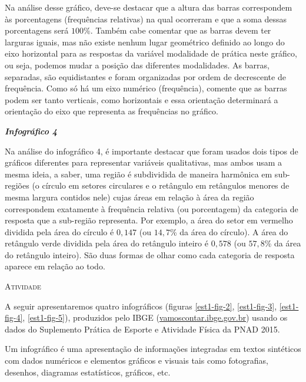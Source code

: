 \documentclass[10 pt,usenames,dvipsnames, oneside]{article}
\begin{document}
\begin{goals}
Na análise desse gráfico, deve-se destacar que a altura das barras correspondem às porcentagens (frequências relativas) na qual ocorreram e que a soma dessas porcentagens será $100$\%. Também cabe comentar que as barras devem ter larguras iguais, mas não existe nenhum lugar geométrico definido ao longo do eixo horizontal para as respostas da variável modalidade de prática neste gráfico, ou seja, podemos mudar a posição das diferentes modalidades. As barras, separadas, são equidistantes e foram organizadas por ordem de decrescente de frequência. Como só há um eixo numérico (frequência), comente que as barras podem ser tanto verticais, como horizontais e essa orientação determinará a orientação do eixo que representa as frequências no gráfico.

\textit{\textbf{Infográfico 4}}

Na análise do infográfico 4, é importante destacar que foram usados dois tipos de gráficos diferentes para representar variáveis qualitativas, mas ambos usam a mesma ideia, a saber, uma região é subdividida de maneira harmônica em sub-regiões (o círculo em setores circulares e o retângulo em retângulos menores de mesma largura contidos nele) cujas áreas em relação à área da região correspondem exatamente à frequência relativa (ou porcentagem) da categoria de resposta que a sub-região representa. Por exemplo, a área do setor em vermelho dividida pela área do círculo é $0{,}147$ (ou $14{,}7$\% da área do círculo). A área do retângulo verde dividida pela área do retângulo inteiro é $0{,}578$ (ou $57{,}8$\% da área do retângulo inteiro). São duas formas de olhar como cada categoria de resposta aparece em relação ao todo.
\end{goals}

\bigskip
\begin{center}
{\large \scshape Atividade}
\end{center}
\fi

A seguir apresentaremos quatro infográficos (figuras \ref{est1-fig-2}, \ref{est1-fig-3}, \ref{est1-fig-4}, \ref{est1-fig-5}), produzidos pelo IBGE (\href{https://vamoscontar.ibge.gov.br/atividades/ensino-medio/9801-pesquisando-a-pratica-de-esportes-e-atividades-fisicas-no-brasil.html}{vamoscontar.ibge.gov.br}) usando os dados do Suplemento Prática de Esporte e Atividade Física da PNAD 2015.

Um infográfico é uma apresentação de informações integradas em textos sintéticos com dados numéricos e elementos gráficos e visuais tais como fotografias, desenhos, diagramas estatísticos, gráficos, etc.
\end{document}
